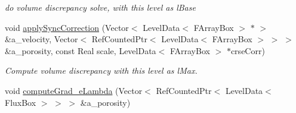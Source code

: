 \begin{DoxyCompactItemize}
\begin{DoxyCompactList}\small\item\em do volume discrepancy solve, with this level as l\-Base \end{DoxyCompactList}\item 
void \hyperlink{class_c_c_projector_af71bc3dcbcd6759135b6f349eafc180a}{apply\-Sync\-Correction} (Vector$<$ Level\-Data$<$ F\-Array\-Box $>$ $\ast$ $>$ \&a\-\_\-velocity, Vector$<$ Ref\-Counted\-Ptr$<$ Level\-Data$<$ F\-Array\-Box $>$ $>$ $>$ \&a\-\_\-porosity, const Real scale, Level\-Data$<$ F\-Array\-Box $>$ $\ast$crse\-Corr)
\begin{DoxyCompactList}\small\item\em Compute volume discrepancy with this level as l\-Max. \end{DoxyCompactList}\item 
\hypertarget{class_c_c_projector_af9259948926d326e7dd8ab17fd458477}{void \hyperlink{class_c_c_projector_af9259948926d326e7dd8ab17fd458477}{compute\-Grad\-\_\-e\-Lambda} (Vector$<$ Ref\-Counted\-Ptr$<$ Level\-Data$<$ Flux\-Box $>$ $>$ $>$ \&a\-\_\-porosity)}\label{class_c_c_projector_af9259948926d326e7dd8ab17fd458477}


\end{DoxyCompactItemize}
